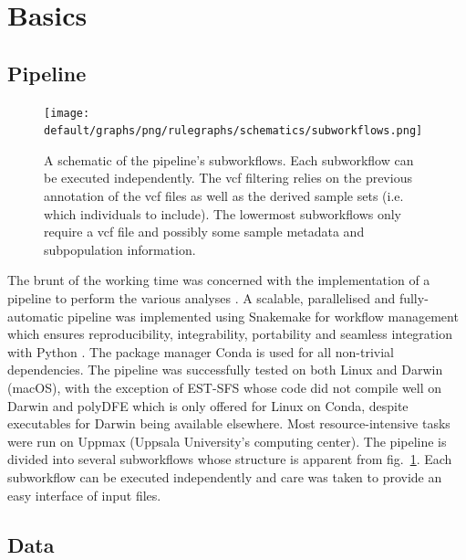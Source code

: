 \documentclass[hidelinks,11pt]{article}
\begin{document}
{    \clearpage


    \section{Basics}
    \label{sec:basics}

    \subsection{Pipeline}
    \label{sec:pipeline}

    \begin{figure}[ht]
        \centering
        \texttt{[image: default/graphs/png/rulegraphs/schematics/subworkflows.png]}
        \caption{A schematic of the pipeline's subworkflows. Each subworkflow can be executed independently. The \acrshort{vcf} filtering relies on the previous annotation of the \acrshort{vcf} files as well as the derived sample sets (i.e. which individuals to include). The lowermost subworkflows only require a \acrshort{vcf} file and possibly some sample metadata and subpopulation information.}
        \label{fig:subworkflows}
    \end{figure}

    The brunt of the working time was concerned with the implementation of a pipeline to perform the various analyses \cite{github-repo}. A scalable, parallelised and fully-automatic pipeline was implemented using Snakemake for workflow management which ensures reproducibility, integrability, portability and seamless integration with Python \cite{snakemake}. The package manager Conda is used for all non-trivial dependencies. The pipeline was successfully tested on both Linux and Darwin (macOS), with the exception of EST-SFS whose code did not compile well on Darwin and polyDFE which is only offered for Linux on Conda, despite executables for Darwin being available elsewhere. Most resource-intensive tasks were run on Uppmax (Uppsala University's computing center). The pipeline is divided into several subworkflows whose structure is apparent from fig.~\ref{fig:subworkflows}. Each subworkflow can be executed independently and care was taken to provide an easy interface of input files.

    \subsection{Data}
    \label{sec:data}

}
\end{document}
